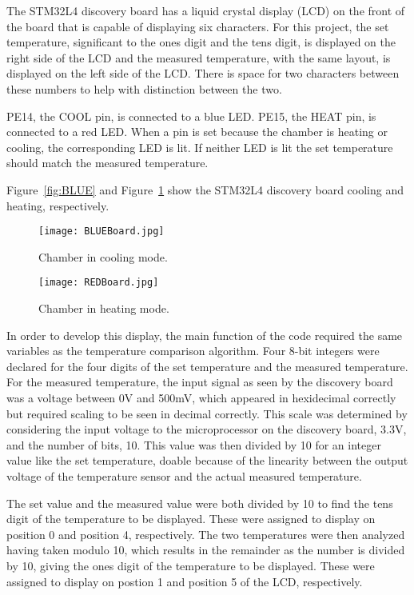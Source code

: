 \documentclass[11pt,letter]{article}
\begin{document}
The STM32L4 discovery board has a liquid crystal display (LCD) on the front of the board that is capable of displaying six characters. For this project, the set temperature, significant to the ones digit and the tens digit, is displayed on the right side of the LCD and the measured temperature, with the same layout, is displayed on the left side of the LCD. There is space for two characters between these numbers to help with distinction between the two.

PE14, the COOL pin, is connected to a blue LED. PE15, the HEAT pin, is connected to a red LED. When a pin is set because the chamber is heating or cooling, the corresponding LED is lit. If neither LED is lit the set temperature should match the measured temperature.

Figure~\ref{fig:BLUE} and Figure~\ref{fig:RED} show the STM32L4 discovery board cooling and heating, respectively. 

\begin{figure}[H]
    \centering
    \begin{minipage}{0.5\textwidth}
        \centering
        \texttt{[image: BLUEBoard.jpg]} %
        \caption{Chamber in cooling mode.}
        \label{fig:BLUE}
    \end{minipage}\hfill
    \begin{minipage}{0.5\textwidth}
        \centering
        \texttt{[image: REDBoard.jpg]} %
        \caption{Chamber in heating mode.}
        \label{fig:RED}
    \end{minipage}
\end{figure}

In order to develop this display, the main function of the code required the same variables as the temperature comparison algorithm. Four 8-bit integers were declared for the four digits of the set temperature and the measured temperature. For the measured temperature, the input signal as seen by the discovery board was a voltage between 0V and 500mV, which appeared in hexidecimal correctly but required scaling to be seen in decimal correctly. This scale was determined by considering the input voltage to the microprocessor on the discovery board, 3.3V, and the number of bits, 10. This value was then divided by 10 for an integer value like the set temperature, doable because of the linearity between the output voltage of the temperature sensor and the actual measured temperature.

The set value and the measured value were both divided by 10 to find the tens digit of the temperature to be displayed. These were assigned to display on position 0 and position 4, respectively. The two temperatures were then analyzed having taken modulo 10, which results in the remainder as the number is divided by 10, giving the ones digit of the temperature to be displayed. These were assigned to display on postion 1 and position 5 of the LCD, respectively. 
\end{document}
